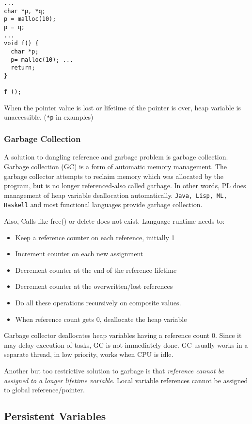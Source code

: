 \begin{multicols}{2}
\begin{verbatim}
...
char *p, *q;
p = malloc(10);
p = q;
...
void f() {
  char *p;
  p= malloc(10); ...
  return;
}

f ();
\end{verbatim}

When the pointer value is lost or lifetime of the pointer is
over, heap variable is unaccessible. (\texttt{*p} in examples)

\subsubsection{Garbage Collection}

A solution to dangling reference and garbage problem is garbage collection. Garbage collection (GC) is a form of automatic memory management. The garbage collector attempts to reclaim memory which was allocated by the program, but is no longer referenced-also called garbage. In other words, PL does management of heap variable deallocation
automatically. \texttt{Java, Lisp, ML, Haskell} and most functional languages provide garbage collection.

Also, Calls like free() or delete does not exist. Language runtime needs to:
\begin{itemize}
  \item Keep a reference counter on each reference, initially 1
  \item Increment counter on each new assignment
  \item Decrement counter at the end of the reference lifetime
  \item Decrement counter at the overwritten/lost references
  \item Do all these operations recursively on composite values.
  \item When reference count gets 0, deallocate the heap variable
\end{itemize}

Garbage collector deallocates heap variables having a reference count 0. Since it may delay execution of tasks, GC is not immediately done. GC usually works in a separate thread, in low priority, works when CPU is idle.

Another but too restrictive solution to garbage is that \textit{reference cannot be assigned to a longer lifetime variable}. Local variable references cannot be assigned to global reference/pointer.

\subsection{Persistent Variables}


\end{multicols}
